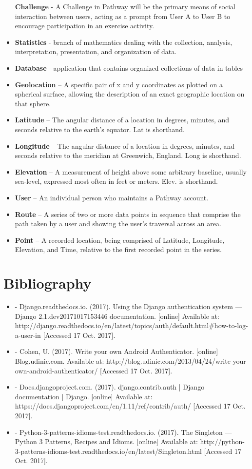 ﻿\documentclass{article}
\begin{document}
\begin{itemize}
    \itme \textbf{Challenge} - A Challenge in Pathway will be the primary means of social interaction between users, acting as a prompt from User A to User B to encourage participation in an exercise activity.
    \item \textbf{Statistics} - branch of mathematics dealing with the collection, analysis, interpretation, presentation, and organization of data.
    \item \textbf{Database} - application that contains organized collections of data in tables
    \item \textbf{Geolocation} – A specific pair of x and y coordinates as plotted on a spherical surface, allowing the description of an exact geographic location on that sphere.
    \item \textbf{Latitude} – The angular distance of a location in degrees, minutes, and seconds relative to the earth’s equator. Lat is shorthand.
    \item \textbf{Longitude} – The angular distance of a location in degrees, minutes, and seconds relative to the meridian at Greenwich, England. Long is shorthand.
    \item \textbf{Elevation} – A measurement of height above some arbitrary baseline, usually sea-level, expressed most often in feet or meters. Elev. is shorthand.
    \item \textbf{User} – An individual person who maintains a Pathway account.
    \item \textbf{Route} – A series of two or more data points in sequence that comprise the path taken by a user and showing the user’s traversal across an area.
    \item \textbf{Point} – A recorded location, being comprised of Latitude, Longitude, Elevation, and Time, relative to the first recorded point in the series.
\end{itemize}

\section{Bibliography}
\begin{itemize}
    \item -  Django.readthedocs.io. (2017). Using the Django authentication system — Django 2.1.dev20171017153446 documentation. [online] Available at: http://django.readthedocs.io/en/latest/topics/auth/default.html#how-to-log-a-user-in [Accessed 17 Oct. 2017].
    \item -  Cohen, U. (2017). Write your own Android Authenticator. [online] Blog.udinic.com. Available at: http://blog.udinic.com/2013/04/24/write-your-own-android-authenticator/ [Accessed 17 Oct. 2017].
    \item - Docs.djangoproject.com. (2017). django.contrib.auth | Django documentation | Django. [online] Available at: https://docs.djangoproject.com/en/1.11/ref/contrib/auth/ [Accessed 17 Oct. 2017].
    \item - Python-3-patterns-idioms-test.readthedocs.io. (2017). The Singleton — Python 3 Patterns, Recipes and Idioms. [online] Available at: http://python-3-patterns-idioms-test.readthedocs.io/en/latest/Singleton.html [Accessed 17 Oct. 2017].
\end{itemize}
\end{document}
